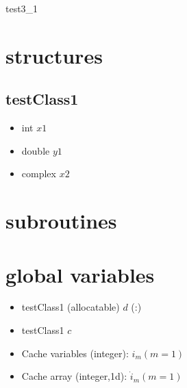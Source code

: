 \documentclass[a4paper,fleqn]{ltjsarticle}
\begin{document}
{\Large test3\_1}
\section{structures}
\subsection{testClass1}
\begin{itemize}
  \item int $x1$
  \item double $y1$
  \item complex $x2$
\end{itemize}
\section{subroutines}
\section{global variables}
\begin{itemize}
\item testClass1 (allocatable) $d$ (:)
\item testClass1 $c$
\item Cache variables (integer): \(i_m (m = 1)\)
\item Cache array (integer,1d): \(\dot{i}_m (m = 1)\)
\end{itemize}
\end{document}
